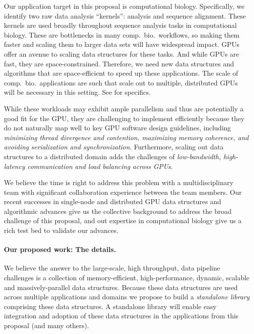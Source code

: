 Our application target in this proposal is computational biology.
Specifically, we identify two raw data analysis ``kernels'':
\Kmer analysis and sequence alignment. These kernels are used broadly
throughout sequence analysis tasks in computational biology. These are bottlenecks in many
comp.~bio.~workflows, so making them faster and scaling them to larger data
sets will have widespread impact. GPUs offer an avenue to scaling data
structures for these tasks. And while GPUs are fast, they are space-constrained.  Therefore,
we need new data structures and algorithms that are space-efficient to speed up
these applications. The scale of comp.~bio.~applications are such that scale
out to multiple, distributed GPUs will be necessary in this setting. See
 for specifics.

 While these workloads may exhibit ample parallelism and thus are potentially a
good fit for the GPU, they are challenging to implement efficiently because
they do not naturally map well to key GPU software design guidelines, including
\emph{minimizing thread divergence and contention, maximizing memory coherence,
and avoiding serialization and synchronization}. Furthermore, scaling out data
structures to a distributed domain adds the challenges of \emph{low-bandwidth,
high-latency communication and load balancing across GPUs}.

 We believe the time is right to address this problem with a multidisciplinary
team with significant collaboration experience between the team members. Our
recent successes in single-node and distributed GPU data structures and
algorithmic advances give us the
collective background to address the broad challenge of this proposal, and out expertise in computational biology give us a rich test bed to validate our advances.


\paragraph{Our proposed work: The details.}
We believe the answer to the large-scale, high throughput, data pipeline challenges is a collection of  memory-efficient,
high-performance, dynamic, scalable and massively-parallel data structures.
Because these data structures are used across multiple applications and domains
we propose to build a \emph{standalone library} comprising these data
structures.
 A standalone library will enable easy integration and adoption of
these data structures in the applications from this proposal (and many others).

